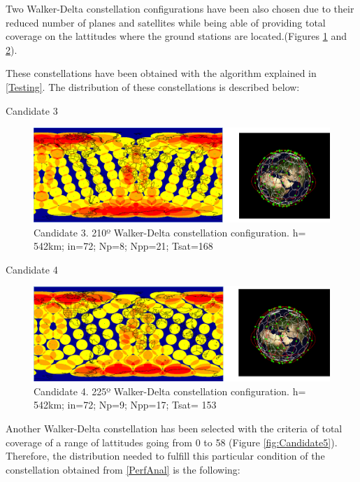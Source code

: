 Two Walker-Delta constellation configurations have been also chosen due to their reduced number of planes and satellites while being able of providing total coverage on the lattitudes where the ground stations are located.(Figures \ref{fig:Candidate3} and \ref{fig:Candidate4}).

These constellations have been obtained with the algorithm explained in \ref{Testing}. The distribution of these constellations is described below:

Candidate 3

\begin{figure}[h]%
	\centering
	\includegraphics[width=1\textwidth]{Candidate3.png}
	\caption{Candidate 3. 210º Walker-Delta constellation configuration. h= 542km; in=72; Np=8; Npp=21; Tsat=168 }
	\label{fig:Candidate3}
\end{figure}

Candidate 4

\begin{figure}[h]%
	\centering
	\includegraphics[width=1\textwidth]{Candidate4.png}
	\caption{Candidate 4. 225º Walker-Delta constellation configuration.
			 h= 542km; in=72; Np=9; Npp=17; Tsat= 153}
	\label{fig:Candidate4}
\end{figure}


Another Walker-Delta constellation has been selected with the criteria of total coverage of a range of lattitudes going from 0 to 58 (Figure \ref{fig:Candidate5}). Therefore, the distribution needed to fulfill this particular condition of the constellation obtained from \ref{PerfAnal} is the following:

